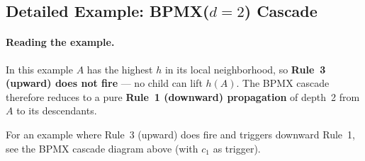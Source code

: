 \documentclass[11pt, a4paper]{article}
\begin{document}
\subsection{Detailed Example: BPMX($d{=}2$) Cascade}

\paragraph{Reading the example.}
\begin{sentences}
\item In this example $A$ has the highest $h$ in its
      local neighborhood, so \textbf{Rule~3 (upward)
      does not fire} --- no child can lift $h(A)$. The
      BPMX cascade therefore reduces to a pure
      \textbf{Rule~1 (downward) propagation} of
      depth~2 from $A$ to its descendants.
\item For an example where Rule~3 (upward) does fire
      and triggers downward Rule~1, see the BPMX
      cascade diagram above (with $c_1$ as trigger).
\end{sentences}

\vspace{6pt}
\end{document}
